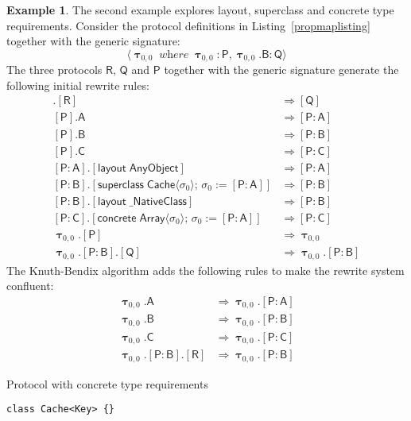 \documentclass[headsepline,bibliography=totoc]{scrreport}
\newcommand{\namesym}[1]{\mathsf{#1}}
\newcommand{\proto}[1]{\bm{\mathsf{#1}}}
\newcommand{\protosym}[1]{[\proto{#1}]}
\newcommand{\gensig}[2]{\langle #1\;\textit{where}\;#2\rangle}
\newcommand{\genericsym}[2]{\bm{\uptau}_{#1,#2}}
\newcommand{\assocsym}[2]{[\proto{#1}\colon\namesym{#2}]}
\newcommand{\layoutsym}[1]{[\mathsf{layout\;#1}]}
\newcommand{\supersym}[1]{[\mathsf{superclass}\;#1]}
\newcommand{\concretesym}[1]{[\mathsf{concrete}\;#1]}
\theoremstyle{definition}
\newtheorem{example}{Example}[chapter]
\theoremstyle{definition}
\theoremstyle{definition}
\begin{document}
\begin{example}\label{propmapexample3}
The second example explores layout, superclass and concrete type requirements. Consider the protocol definitions in Listing~\ref{propmaplisting} together with the generic signature:
\[\gensig{\genericsym{0}{0}}{\genericsym{0}{0}\colon\proto{P}, \genericsym{0}{0}.\namesym{B}\colon\proto{Q}}\]
The three protocols $\proto{R}$, $\proto{Q}$ and $\proto{P}$ together with the generic signature generate the following initial rewrite rules:
\begin{align*}
\protosym{Q}.\protosym{R}&\Rightarrow\protosym{Q}\tag{1}\\
\protosym{P}.\namesym{A}&\Rightarrow\assocsym{P}{A}\tag{2}\\
\protosym{P}.\namesym{B}&\Rightarrow\assocsym{P}{B}\tag{3}\\
\protosym{P}.\namesym{C}&\Rightarrow\assocsym{P}{C}\tag{4}\\
\assocsym{P}{A}.\layoutsym{AnyObject}&\Rightarrow\assocsym{P}{A}\tag{5}\\
\assocsym{P}{B}.\supersym{\namesym{Cache}\langle\sigma_0\rangle;\,\sigma_0:=\assocsym{P}{A}}&\Rightarrow\assocsym{P}{B}\tag{6}\\
\assocsym{P}{B}.\layoutsym{\_NativeClass}&\Rightarrow\assocsym{P}{B}\tag{7}\\
\assocsym{P}{C}.\concretesym{\namesym{Array}\langle\sigma_0\rangle;\,\sigma_0:=\assocsym{P}{A}}&\Rightarrow\assocsym{P}{C}\tag{8}\\
\genericsym{0}{0}.\protosym{P}&\Rightarrow\genericsym{0}{0}\tag{9}\\
\genericsym{0}{0}.\assocsym{P}{B}.\protosym{Q}&\Rightarrow\genericsym{0}{0}.\assocsym{P}{B}\tag{10}
\end{align*}
The Knuth-Bendix algorithm adds the following rules to make the rewrite system confluent:
\begin{align*}
\genericsym{0}{0}.\namesym{A}&\Rightarrow\genericsym{0}{0}.\assocsym{P}{A}\tag{11}\\
\genericsym{0}{0}.\namesym{B}&\Rightarrow\genericsym{0}{0}.\assocsym{P}{B}\tag{12}\\
\genericsym{0}{0}.\namesym{C}&\Rightarrow\genericsym{0}{0}.\assocsym{P}{C}\tag{13}\\
\genericsym{0}{0}.\assocsym{P}{B}.\protosym{R}&\Rightarrow\genericsym{0}{0}.\assocsym{P}{B}\tag{14}
\end{align*}
\begin{listing}\caption{Protocol with concrete type requirements}\label{propmaplisting}
\begin{Verbatim}
class Cache<Key> {}


\end{Verbatim}
\end{listing}
\end{example}
\end{document}
